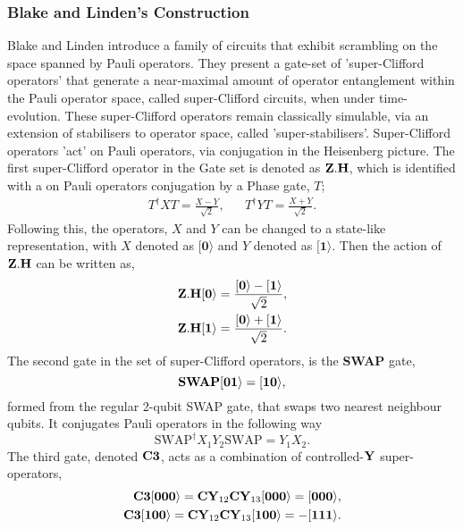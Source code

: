 \subsubsection{Blake and Linden's Construction}
Blake and Linden introduce a family of circuits that exhibit scrambling on the space spanned by Pauli operators.
They present a gate-set of 'super-Clifford operators' that generate a near-maximal amount of operator entanglement
within the Pauli operator space, called super-Clifford circuits, when under time-evolution. These super-Clifford operators
remain classically simulable, via an extension of stabilisers to operator space, called 'super-stabilisers'.
Super-Clifford operators 'act' on Pauli operators, via conjugation in the Heisenberg picture.
The first super-Clifford operator in the Gate set is denoted as ${\bf Z.H}$, which is identified with a on Pauli operators
conjugation by a Phase gate, $T$;
\begin{align}\label{phasegate}
  T^{\dagger} X T = \frac{X - Y}{\sqrt{2}}, &  & T^{\dagger} Y T = \frac{X + Y}{\sqrt{2}}.
\end{align}
Following this, the operators, $X$ and $Y$ can be changed to a state-like representation, with
$X$ denoted as $[{\mathbf 0}\rangle$ and $Y$ denoted as $[{\mathbf 1}\rangle$. Then the action of $\bf Z.H$
can be written as,
\begin{align}
  {\bf Z.H}[{\bf 0}\rangle = \frac{[{\bf 0}\rangle - [{\bf 1}\rangle}{\sqrt{2}}, \\
  {\bf Z.H}[{\bf 1}\rangle = \frac{[{\bf 0}\rangle + [{\bf 1}\rangle}{\sqrt{2}}.
\end{align}
The second gate in the set of super-Clifford operators, is the {\bf SWAP} gate,
\begin{equation}
  \text{\bf SWAP} [{\bf 01}\rangle = [{\bf 10}\rangle,
\end{equation}
formed from the regular 2-qubit SWAP gate, that swaps two nearest neighbour qubits. It conjugates
Pauli operators in the following way
\begin{equation}
  \text{SWAP}^{\dagger} X_1Y_2 \text{SWAP} = Y_1X_2.
\end{equation}
The third gate, denoted $\bf C3$, acts as a combination of controlled-$\text{\bf Y}$ super-operators,
\begin{align}
  {\bf C3} [{\bf 000}\rangle=  {\bf CY}_{12}{\bf CY}_{13} [{\bf000}\rangle = [{\bf 000}\rangle, \\
  {\bf C3} [{\bf 100}\rangle=  {\bf CY}_{12}{\bf CY}_{13} [{\bf100}\rangle = -[{\bf 111}\rangle.
\end{align}
